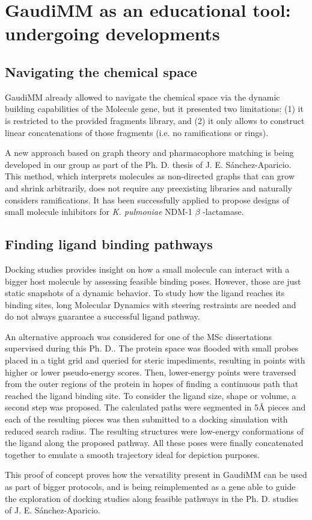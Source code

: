 \section{GaudiMM as an educational tool: undergoing developments}
\label{chap:appendix-b}


\subsection{Navigating the chemical space}
GaudiMM already allowed to navigate the chemical space via the dynamic building capabilities of the Molecule gene, but it presented two limitations: (1) it is restricted to the provided fragments library, and (2) it only allows to construct linear concatenations of those fragments (i.e. no ramifications or rings).

A new approach based on graph theory and pharmacophore matching is being developed in our group as part of the Ph. D. thesis of J. E. Sánchez-Aparicio. This method, which interprets molecules as non-directed graphs that can grow and shrink arbitrarily, does not require any preexisting libraries and naturally considers ramifications. It has been successfully applied to propose designs of small molecule inhibitors for \textit{K. pulmoniae} NDM-1 $ \beta $ -lactamase.

\subsection{Finding ligand binding pathways}
Docking studies provides insight on how a small molecule can interact with a bigger host molecule by assessing feasible binding poses. However, those are just static snapshots of a dynamic behavior. To study how the ligand reaches its binding sites, long Molecular Dynamics with steering restraints are needed and do not always guarantee a successful ligand pathway.

An alternative approach was considered for one of the MSc dissertations supervised during this Ph. D.. The protein space was flooded with small probes placed in a tight grid and queried for steric impediments, resulting in points with higher or lower pseudo-energy scores. Then, lower-energy points were traversed from the outer regions of the protein in hopes of finding a continuous path that reached the ligand binding site. To consider the ligand size, shape or volume, a second step was proposed. The calculated paths were segmented in 5Å pieces and each of the resulting pieces was then submitted to a docking simulation with reduced search radius. The resulting structures were low-energy conformations of the ligand along the proposed pathway. All these poses were finally concatenated together to emulate a smooth trajectory ideal for depiction purposes.

This proof of concept proves how the versatility present in GaudiMM can be used as part of bigger protocols, and is being reimplemented as a gene able to guide the exploration of docking studies along feasible pathways in the Ph. D. studies of J. E. Sánchez-Aparicio.
